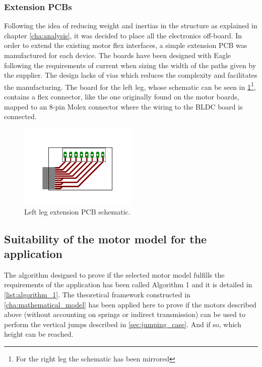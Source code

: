 
\subsubsection{Extension PCBs} %
\label{ssub:extension_pcbs}
Following the idea of reducing weight and inertias in the structure as explained in chapter \ref{cha:analysis}, it was decided to place all the electronics off-board.
In order to extend the existing motor flex interfaces, a simple extension PCB was manufactured for each device.
The boards have been designed with Eagle following the requirements of current when sizing the width of the paths given by the supplier.
The design lacks of vias which reduces the complexity and facilitates the manufacturing.
The board for the left leg, whose schematic can be seen in \ref{fig:pcb1}\footnote{For the right leg the schematic has been mirrored}, contains a flex connector, like the one originally found on the motor boards, mapped to an 8-pin Molex connector where the wiring to the BLDC board is connected.

\begin{figure}[ht]
	\centering
	\includegraphics[width=0.5\textwidth]{figures/expansion_board.pdf}
	\caption{Left leg extension PCB schematic.}
	\label{fig:pcb1}
\end{figure}



\subsection{Suitability of the motor model for the application} %
\label{sub:suitability_of_the_motor_model_for_the_application}
The algorithm designed to prove if the selected motor model fulfills the requirements of the application has been called Algorithm 1 and it is detailed in \ref{list:algorithm_1}.
The theoretical framework constructed in \ref{cha:mathematical_model} has been applied here to prove if the motors described above (without accounting on springs or indirect transmission) can be used to perform the vertical jumps described in \ref{sec:jumping_case}.
And if so, which height can be reached.

